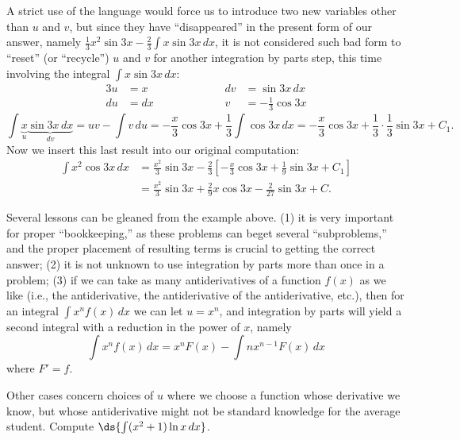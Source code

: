A strict use of the language would force us to introduce
two new variables other than $u$ and $v$, but since they
have ``disappeared'' in the present form of our answer,
namely $\frac13x^2\sin3x-\frac23\int x\sin3x\,dx$, it is
not considered such bad form to ``reset'' (or ``recycle'') $u$ and $v$
for another integration by parts step, this time 
involving the integral $\int x\sin 3x\,dx$:
\begin{alignat*}{3}
u&=x&&\qquad\qquad&dv&=\sin3x\,dx\\
du&=dx&&&v&=-\frac13\cos3x\end{alignat*}
$$\int \underbrace{x}_{u}\underbrace{\sin3x\,dx}_{dv}
=uv-\int v\,du
=-\frac{x}3\cos3x+\frac13\int\cos3x\,dx
=-\frac{x}3\cos3x+\frac13\cdot\frac13\sin 3x+C_1.$$
Now we insert this last result into our original computation:
\begin{align*}
\int x^2\cos3x\,dx&=\frac{x^2}3\sin3x-\frac23\left[-\frac{x}3\cos3x
           +\frac19\sin3x+C_1\right]\\
  &=\frac{x^2}3\sin3x+\frac{2}{9}x\cos3x-\frac2{27}\sin3x+C.\end{align*}
\eex

Several lessons can be gleaned from the example above.  (1)
it is very important for proper ``bookkeeping,'' as these
problems can beget several ``subproblems,'' and the proper
placement of resulting terms is crucial to getting the correct answer;
(2) it is not unknown to use integration by parts more
than once in a problem; (3) if we can take as many 
antiderivatives of a function $f(x)$ as we like
(i.e., the antiderivative, the antiderivative of the
antiderivative, etc.), then for an integral
$\int x^nf(x)\,dx$ we can let $u=x^n$, and integration
by parts will yield a second integral with a reduction
in the power of $x$, namely 
\begin{equation}
\int x^nf(x)\,dx=x^nF(x)-\int nx^{n-1}F(x)\,dx\end{equation}
where $F'=f$. 

Other cases concern choices of $u$ where we choose a 
function whose derivative we know, but whose antiderivative
might not be standard knowledge for the average student.
\bex Compute $\ds{\int(x^2+1)\ln x\,dx}$.

